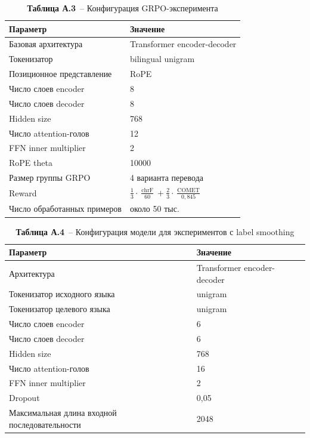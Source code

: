 \begin{table}[H]
	\centering
	\caption*{\textbf{Таблица А.3}~-- Конфигурация GRPO-эксперимента}
	\begin{tabularx}{\textwidth}{|p{}|X|}
		\hline
		\textbf{Параметр} & \textbf{Значение} \\
		\hline
		Базовая архитектура & Transformer encoder-decoder \\
		\hline
		Токенизатор & bilingual unigram \\
		\hline
		Позиционное представление & RoPE \\
		\hline
		Число слоев encoder & 8 \\
		\hline
		Число слоев decoder & 8 \\
		\hline
		Hidden size & 768 \\
		\hline
		Число attention-голов & 12 \\
		\hline
		FFN inner multiplier & 2 \\
		\hline
		RoPE theta & 10000 \\
		\hline
		Размер группы GRPO & 4 варианта перевода \\
		\hline
		Reward & $\frac{1}{3} \cdot \frac{\operatorname{chrF}}{60} + \frac{2}{3} \cdot \frac{\operatorname{COMET}}{0{,}845}$ \\
		\hline
		Число обработанных примеров & около 50 тыс. \\
		\hline
	\end{tabularx}
\end{table}

\begin{table}[H]
	\centering
	\caption*{\textbf{Таблица А.4}~-- Конфигурация модели для экспериментов с label smoothing}
	\begin{tabularx}{\textwidth}{|p{}|X|}
		\hline
		\textbf{Параметр} & \textbf{Значение} \\
		\hline
		Архитектура & Transformer encoder-decoder \\
		\hline
		Токенизатор исходного языка & unigram \\
		\hline
		Токенизатор целевого языка & unigram \\
		\hline
		Число слоев encoder & 6 \\
		\hline
		Число слоев decoder & 6 \\
		\hline
		Hidden size & 768 \\
		\hline
		Число attention-голов & 16 \\
		\hline
		FFN inner multiplier & 2 \\
		\hline
		Dropout & 0{,}05 \\
		\hline
		Максимальная длина входной последовательности & 2048 \\
		\hline
	\end{tabularx}
\end{table}

